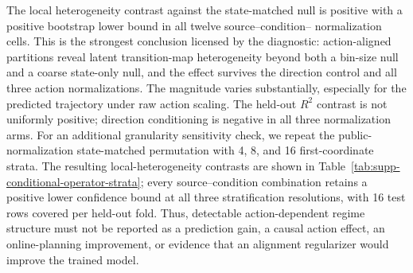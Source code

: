 \documentclass{article}
\begin{document}
The local heterogeneity contrast against the state-matched null is positive
with a positive bootstrap lower bound in all twelve source--condition--
normalization cells. This is the strongest conclusion licensed by the
diagnostic: action-aligned partitions reveal latent transition-map
heterogeneity beyond both a bin-size null and a coarse state-only null, and the
effect survives the direction control and all three action normalizations. The
magnitude varies substantially, especially for the predicted trajectory under
raw action scaling. The held-out $R^2$ contrast is not uniformly positive;
direction conditioning is negative in all three normalization arms. For an
additional granularity sensitivity check, we repeat the public-normalization
state-matched permutation with 4, 8, and 16 first-coordinate strata. The
resulting local-heterogeneity contrasts are shown in
Table~\ref{tab:supp-conditional-operator-strata}; every source--condition
combination retains a positive lower confidence bound at all three
stratification resolutions, with 16 test rows covered per held-out fold. Thus,
detectable action-dependent regime structure must not be reported as a
prediction gain, a causal action effect, an online-planning improvement, or
evidence that an alignment regularizer would improve the trained model.

\begin{table}[H]
\centering
\scriptsize
\setlength{\tabcolsep}{3pt}
\caption{Sensitivity of the state-matched null to coarse state-stratum count
on the public PushT validation set. Each cell reports the mean
$\Delta\mathcal H^{\mathrm{state}}$ and its 95\% episode-bootstrap interval
for 4, 8, or 16 first-coordinate strata. All reports use the same 21 held-out
episodes and 42 windows, with 2,000 episode-cluster bootstrap replicates per
cell. The check concerns the granularity of a descriptive null, not a claim
that any stratum count identifies a physical state partition.}
\label{tab:supp-conditional-operator-strata}
\end{table}
\end{document}
